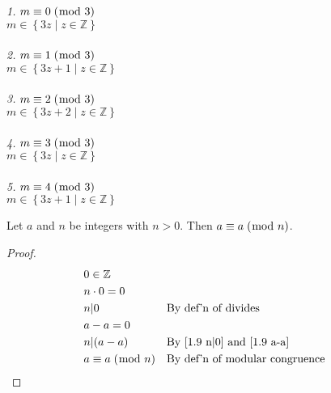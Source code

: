 \documentclass[../main.tex]{subfiles}
\begin{document}
\hspace*{0.1mm} \emph{1. $m \equiv 0 \; (\bmod \; 3)$} \\
\hspace*{15mm} $m \in \left\{ 3z \mid z \in \mathbb{Z} \right\}$
\\\\
\hspace*{5mm} \emph{2. $m \equiv 1 \; (\bmod \; 3)$} \\
\hspace*{15mm} $m \in \left\{ 3z+1 \mid z \in \mathbb{Z} \right\}$
\\\\
\hspace*{5mm} \emph{3. $m \equiv 2 \; (\bmod \; 3)$} \\
\hspace*{15mm} $m \in \left\{ 3z+2 \mid z \in \mathbb{Z} \right\}$
\\\\
\hspace*{5mm} \emph{4. $m \equiv 3 \; (\bmod \; 3)$} \\
\hspace*{15mm} $m \in \left\{ 3z \mid z \in \mathbb{Z} \right\}$
\\\\
\hspace*{5mm} \emph{5. $m \equiv 4 \; (\bmod \; 3)$} \\
\hspace*{15mm} $m \in \left\{ 3z+1 \mid z \in \mathbb{Z} \right\}$



\pagebreak



\begin{thm} \label{1.9}
Let $a$ and $n$ be integers with $n > 0$. Then $a \equiv a \; (\bmod \; n)$.
\end{thm}

\begin{proof}
\begin{align}
    &0 \in \mathbb{Z} \\
    &n \cdot 0 = 0 \\
    \label{1.9 n|0}
    &n|0 && \mbox{By def'n of divides} \\
    \label{1.9 a-a}
    &a-a = 0 \\
    &n|(a-a) && \mbox{By \eqref{1.9 n|0} and \eqref{1.9 a-a}} \\
    &a \equiv a \; (\bmod \; n) && \mbox{By def'n of modular congruence} \qedhere
\end{align}
\end{proof}
\end{document}
